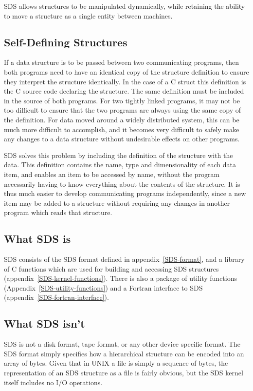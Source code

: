 SDS allows structures to be manipulated dynamically, while retaining the
ability to move a structure as a single entity between machines.

\subsection{Self-Defining Structures}

If a data structure is to be passed between two communicating programs, then
both programs need to have an identical copy of the structure definition to
ensure they interpret the structure identically. In the case of a C struct this
definition is the C source code declaring the structure. The same definition
must be included in the source of both programs. For two tightly linked
programs, it may not be too difficult to ensure that the two programs are
always using the same copy of the definition. For data moved around a widely
distributed system, this can be much more difficult to accomplish, and it
becomes very difficult to safely make any changes to a data structure without
undesirable effects on other programs.

SDS solves this problem by including the definition of the structure with the
data. This definition contains the name, type and dimensionality of each data
item, and enables an item to be accessed by name, without the program
necessarily having to know everything about the contents of the structure. It is
thus much easier to develop communicating programs independently, since a new
item may be added to a structure without requiring any changes in another
program which reads that structure.

\subsection{What SDS is}

SDS consists of the SDS format defined in appendix~\ref{SDS-format}, and a
library of C functions which are used for building and accessing SDS structures
(appendix~\ref{SDS-kernel-functions}). There is also a package of utility
functions (Appendix~\ref{SDS-utility-functions}) and a Fortran interface to SDS
(appendix~\ref{SDS-fortran-interface}).

\subsection{What SDS isn't}

SDS is not a disk format, tape format, or any other device specific format. The
SDS format simply specifies how a hierarchical structure can be encoded into an
array of bytes. Given that in UNIX a file is simply a sequence of bytes, the
representation of an SDS structure as a file is fairly obvious, but the SDS
kernel itself includes no I/O operations.

